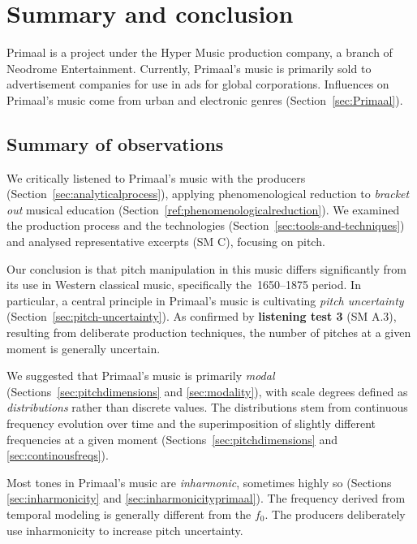 \documentclass{article}
\begin{document}
\newpage



\section{Summary and conclusion}\label{sec:conclusion}


Primaal is a project under the Hyper Music production company, a branch of Neodrome Entertainment. Currently, Primaal's music is primarily sold to advertisement companies for use in ads for global corporations. Influences on Primaal's music come from urban and electronic genres (Section~\ref{sec:Primaal}).


\subsection{Summary of observations}


We critically listened to Primaal's music with the producers (Section~\ref{sec:analyticalprocess}), applying phenomenological reduction to \emph{bracket out} musical education (Section~\ref{ref:phenomenologicalreduction}). We examined the production process and the technologies (Section~\ref{sec:tools-and-techniques}) and analysed representative excerpts (SM C), focusing on pitch.

Our conclusion is that pitch manipulation in this music differs significantly from its use in Western classical music, specifically the~1650--1875 period. In particular, a central principle in Primaal's music is cultivating \emph{pitch uncertainty} (Section~\ref{sec:pitch-uncertainty}). As confirmed by \textbf{listening test 3} (SM A.3), resulting from deliberate production techniques, the number of pitches at a given moment is generally uncertain.

We suggested that Primaal's music is primarily \emph{modal} (Sections~\ref{sec:pitchdimensions} and \ref{sec:modality}), with scale degrees defined as \emph{distributions} rather than discrete values. The distributions stem from continuous frequency evolution over time and the superimposition of slightly different frequencies at a given moment (Sections~\ref{sec:pitchdimensions} and \ref{sec:continousfreqs}).

Most tones in Primaal's music are \emph{inharmonic}, sometimes highly so (Sections \ref{sec:inharmonicity} and \ref{sec:inharmonicityprimaal}). The frequency derived from temporal modeling is generally different from the $f_0$. The producers deliberately use inharmonicity to increase pitch uncertainty.
\end{document}
